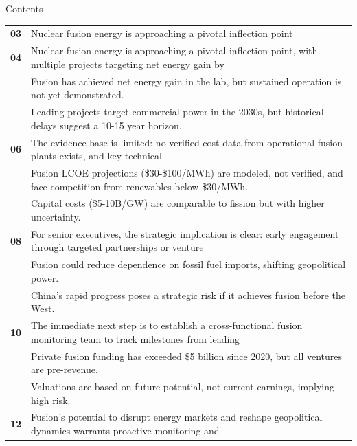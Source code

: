 \documentclass[10pt,a4paper]{article}
\begin{document}
\clearpage
{\sffamily\fontsize{26}{31}\selectfont\color{BONavy} Contents}\par\vspace{10pt}
\begin{tabularx}{\linewidth}{p{14mm}Y}
\textcolor{BOGreen}{\bfseries 03} & Nuclear fusion energy is approaching a pivotal inflection point \\[7pt]
\textcolor{BOGreen}{\bfseries 04} & Nuclear fusion energy is approaching a pivotal inflection point, with multiple projects targeting net energy gain by \\[5pt]
 & {\scriptsize\color{BOMuted} Fusion has achieved net energy gain in the lab, but sustained operation is not yet demonstrated.} \\[1pt]
 & {\scriptsize\color{BOMuted} Leading projects target commercial power in the 2030s, but historical delays suggest a 10-15 year horizon.} \\[1pt]
\textcolor{BOGreen}{\bfseries 06} & The evidence base is limited: no verified cost data from operational fusion plants exists, and key technical \\[5pt]
 & {\scriptsize\color{BOMuted} Fusion LCOE projections (\$30-\$100/MWh) are modeled, not verified, and face competition from renewables below \$30/MWh.} \\[1pt]
 & {\scriptsize\color{BOMuted} Capital costs (\$5-10B/GW) are comparable to fission but with higher uncertainty.} \\[1pt]
\textcolor{BOGreen}{\bfseries 08} & For senior executives, the strategic implication is clear: early engagement through targeted partnerships or venture \\[5pt]
 & {\scriptsize\color{BOMuted} Fusion could reduce dependence on fossil fuel imports, shifting geopolitical power.} \\[1pt]
 & {\scriptsize\color{BOMuted} China's rapid progress poses a strategic risk if it achieves fusion before the West.} \\[1pt]
\textcolor{BOGreen}{\bfseries 10} & The immediate next step is to establish a cross-functional fusion monitoring team to track milestones from leading \\[5pt]
 & {\scriptsize\color{BOMuted} Private fusion funding has exceeded \$5 billion since 2020, but all ventures are pre-revenue.} \\[1pt]
 & {\scriptsize\color{BOMuted} Valuations are based on future potential, not current earnings, implying high risk.} \\[1pt]
\textcolor{BOGreen}{\bfseries 12} & Fusion's potential to disrupt energy markets and reshape geopolitical dynamics warrants proactive monitoring and \\[5pt]

\end{tabularx}
\end{document}
